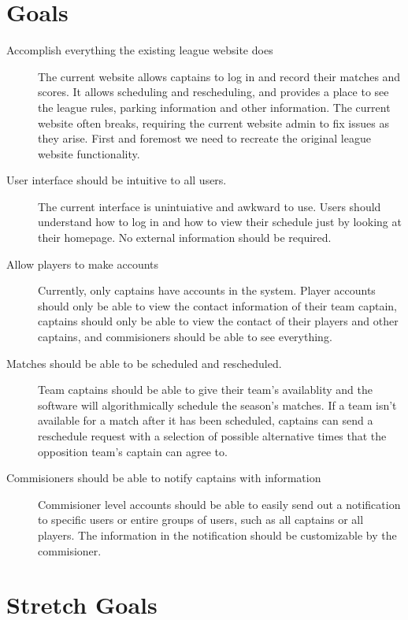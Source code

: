 \documentclass{article}
\begin{document}

\section{Goals}

\begin{description}
    \item [Accomplish everything the existing league website does]
    The current website allows captains to log in and record their matches
    and scores. It allows scheduling and rescheduling, and provides a place
    to see the league rules, parking information and other information. The
    current website often breaks, requiring the current website admin to fix
    issues as they arise. First and foremost we need to recreate the original
    league website functionality.
    \item [User interface should be intuitive to all users.] The current
    interface is unintuiative and awkward to use. Users should understand
    how to log in and how to view their schedule just by looking at their
    homepage. No external information should be required.
    \item [Allow players to make accounts] Currently, only captains have
    accounts in the system. Player accounts should only be able to view the
    contact information of their team captain, captains should only be able
    to view the contact of their players and other captains, and commisioners
    should be able to see everything.
    \item [Matches should be able to be scheduled and rescheduled.] 
    Team captains should be able to give their team's availablity and the
    software will algorithmically schedule the season's matches. If a team
    isn't available for a match after it has been scheduled, captains can
    send a reschedule request with a selection of possible alternative times
    that the opposition team's captain can agree to.
    \item [Commisioners should be able to notify captains with information]
    Commisioner level accounts should be able to easily send out a
    notification to specific users or entire groups of users, such as all
    captains or all players. The information in the notification should be
    customizable by the commisioner.
\end{description}

\section{Stretch Goals}
\end{document}
